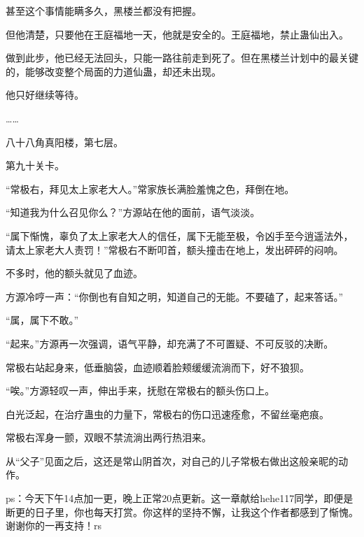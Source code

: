 \begin{this_body}
甚至这个事情能瞒多久，黑楼兰都没有把握。

但他清楚，只要他在王庭福地一天，他就是安全的。王庭福地，禁止蛊仙出入。

做到此步，他已经无法回头，只能一路往前走到死了。但在黑楼兰计划中的最关键的，能够改变整个局面的力道仙蛊，却还未出现。

他只好继续等待。

……

八十八角真阳楼，第七层。

第九十关卡。

“常极右，拜见太上家老大人。”常家族长满脸羞愧之色，拜倒在地。

“知道我为什么召见你么？”方源站在他的面前，语气淡淡。

“属下惭愧，辜负了太上家老大人的信任，属下无能至极，令凶手至今逍遥法外，请太上家老大人责罚！”常极右不断叩首，额头撞击在地上，发出砰砰的闷响。

不多时，他的额头就见了血迹。

方源冷哼一声：“你倒也有自知之明，知道自己的无能。不要磕了，起来答话。”

“属，属下不敢。”

“起来。”方源再一次强调，语气平静，却充满了不可置疑、不可反驳的决断。

常极右站起身来，低垂脑袋，血迹顺着脸颊缓缓流淌而下，好不狼狈。

“唉。”方源轻叹一声，伸出手来，抚慰在常极右的额头伤口上。

白光泛起，在治疗蛊虫的力量下，常极右的伤口迅速痊愈，不留丝毫疤痕。

常极右浑身一颤，双眼不禁流淌出两行热泪来。

从“父子”见面之后，这还是常山阴首次，对自己的儿子常极右做出这般亲昵的动作。

ps：今天下午14点加一更，晚上正常20点更新。这一章献给hehe117同学，即便是断更的日子里，你也每天打赏。你这样的坚持不懈，让我这个作者都感到了惭愧。谢谢你的一再支持！rs

\end{this_body}


